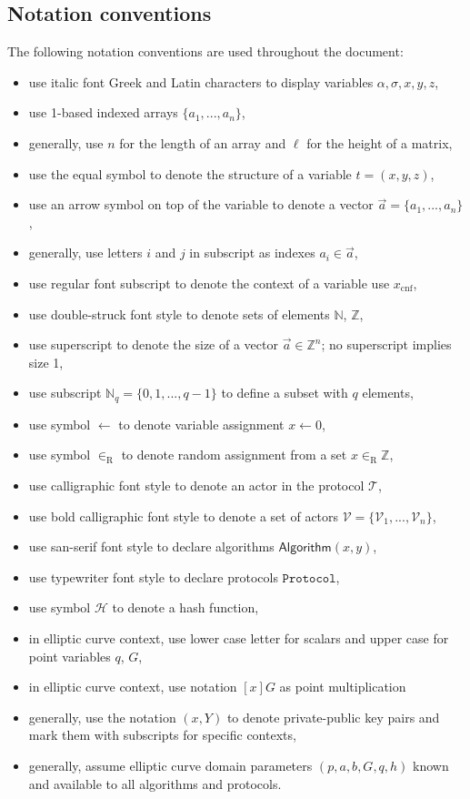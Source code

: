 \clearpage
\subsection{Notation conventions}
The following notation conventions are used throughout the document:
\begin{itemize}
    \item use italic font Greek and Latin characters to display variables $\alpha, \sigma, x, y, z$,
    \item use 1-based indexed arrays $\{ a_1, ..., a_n \}$,
    \item generally, use $n$ for the length of an array and $\ell$ for the height of a matrix,
    \item use the equal symbol to denote the structure of a variable $t = (x, y, z)$,
    \item use an arrow symbol on top of the variable to denote a vector $\vec{a} = \{ a_1, ..., a_n \}$,
    \item generally, use letters $i$ and $j$ in subscript as indexes $a_i \in \vec{a}$,
    \item use regular font subscript to denote the context of a variable use $x_\mathrm{cnf}$,
    \item use double-struck font style to denote sets of elements $\mathbb{N}$, $\mathbb{Z}$,
    \item use superscript to denote the size of a vector $\vec{a} \in \mathbb{Z}^n$; no superscript implies size 1,
    \item use subscript $\mathbb{N}_q = \{ 0, 1, ..., q-1 \}$ to define a subset with $q$ elements,
    \item use symbol $\gets$ to denote variable assignment $x \gets 0$,
    \item use symbol $\in_\mathrm{R}$ to denote random assignment from a set $x \in_\mathrm{R} \mathbb{Z}$,
    \item use calligraphic font style to denote an actor in the protocol $\mathcal{T}$,
    \item use bold calligraphic font style to denote a set of actors $\boldsymbol{\mathcal{V}} = \{ \mathcal{V}_1, ..., \mathcal{V}_n \}$,
    \item use san-serif font style to declare algorithms $\mathsf{Algorithm}(x, y)$,
    \item use typewriter font style to declare protocols $\mathtt{Protocol}$,
    \item use symbol $\mathcal{H}$ to denote a hash function,
    \item in elliptic curve context, use lower case letter for scalars and upper case for point variables $q$, $G$,
    \item in elliptic curve context, use notation $[x]G$ as point multiplication
    \item generally, use the notation $(x, Y)$ to denote private-public key pairs and mark them with subscripts for specific contexts,
    \item generally, assume elliptic curve domain parameters $(p, a, b, G, q, h)$ known and available to all algorithms and protocols.
\end{itemize}
